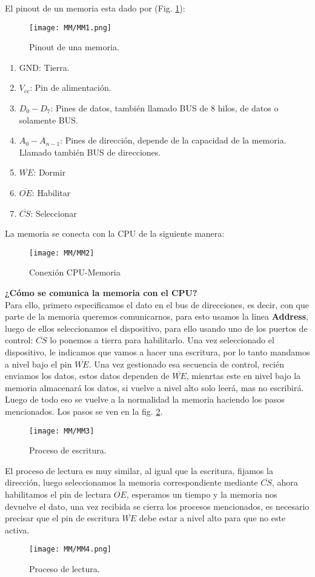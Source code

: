 \documentclass[
	12pt, %
	fleqn, %
	a4paper, %
]{LegrandOrangeBook}
\begin{document}
El pinout de un memoria esta dado por (Fig. \ref{fig:mem pinout}):
\begin{figure}[H]
\centering
\texttt{[image: MM/MM1.png]}
\caption{Pinout de una memoria.}
\label{fig:mem pinout}
\end{figure}
\begin{enumerate}
\item GND: Tierra.
\item $V_{cc}$: Pin de alimentación.
\item $D_0-D_7$: Pines de datos, también llamado BUS de 8 hilos, de datos o solamente BUS.
\item $A_0-A_{n-1}$: Pines de dirección, depende de la capacidad de la memoria. Llamado también BUS de direcciones.
\item $\overline{WE}$: Dormir
\item $\overline{OE}$: Habilitar
\item $\overline{CS}$: Seleccionar
\end{enumerate}
La memoria se conecta con la CPU de la siguiente manera:\\
\begin{figure}[H]
\centering
\texttt{[image: MM/MM2]}
\caption{Conexión CPU-Memoria}
\end{figure}
\textbf{¿Cómo se comunica la memoria con el CPU?}\\
Para ello, primero especificamos el dato en el bus de direcciones, es decir, con que parte de la memoria queremos comunicarnos, para esto usamos la linea \textbf{Address}, luego de ellos seleccionamos el dispositivo, para ello usando uno de los puertos de control: $\overline{CS}$ lo ponemos a tierra para habilitarlo. Una vez seleccionado el dispositivo, le indicamos que vamos a hacer una escritura, por lo tanto mandamos a nivel bajo el pin $\overline{WE}$. Una vez gestionado esa secuencia de control, recién enviamos los datos, estos datos dependen de $\overline{WE}$, mienrtas este en nivel bajo la memoria almacenará los datos, si vuelve a nivel alto solo leerá, mas no escribirá. Luego de todo eso se vuelve a la normalidad la memoria haciendo los pasos mencionados. Los pasos se ven en la fig. \ref{fig: escritura memoria}.\\
\begin{figure}[H]
\centering
\texttt{[image: MM/MM3]}
\caption{Proceso de escritura.}
\label{fig: escritura memoria}
\end{figure}
El proceso de lectura es muy similar, al igual que la escritura, fijamos la dirección, luego seleccionamos la memoria correspondiente mediante $\overline{CS}$, ahora habilitamos el pin de lectura $\overline{OE}$, esperamos un tiempo y la memoria nos devuelve el dato, una vez recibida se cierra los procesos mencionados, es necesario precisar que el pin de escritura $\overline{WE}$ debe estar a nivel alto para que no este activa.
\begin{figure}[H]
\centering
\texttt{[image: MM/MM4.png]}
\caption{Proceso de lectura.}
\end{figure}
\end{document}
